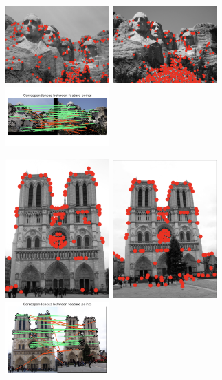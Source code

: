 \begin{figure}[h]
    \centering
    \includegraphics[width=4cm]{mt_rushmore1.png}
    \includegraphics[width=4cm]{mt_rushmore2.png}
    \includegraphics[width=4cm]{mt_rushmore3.png}
    \label{fig:result1}
\end{figure}

\begin{figure}[h]
    \centering
    \includegraphics[width=4cm]{notre_dame1.png}
    \includegraphics[width=4cm]{notre_dame2.png}
    \includegraphics[width=4cm]{notre_dame3.png}
    \label{fig:result1}
\end{figure}

